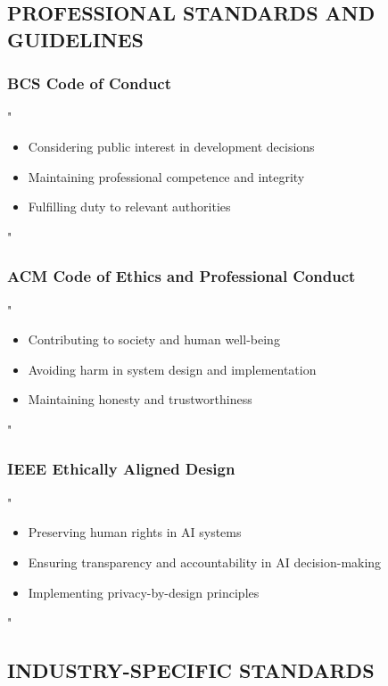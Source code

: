 \documentclass[14pt,a4paper]{article}
\begin{document}
\textit{\parencite{DfE2024b}}


\subsection*{PROFESSIONAL STANDARDS AND GUIDELINES}

\subsubsection*{BCS Code of Conduct}
"
\begin{itemize}
    \item Considering public interest in development decisions
    \item Maintaining professional competence and integrity
    \item Fulfilling duty to relevant authorities
\end{itemize}
"

\textit{\parencite[pp. 1-5]{BCS2024}}


\subsubsection*{ACM Code of Ethics and Professional Conduct}
"
\begin{itemize}
    \item Contributing to society and human well-being
    \item Avoiding harm in system design and implementation
    \item Maintaining honesty and trustworthiness
\end{itemize}
"

\textit{\parencite[pp. 1-4]{ACM2024}}

\subsubsection*{IEEE Ethically Aligned Design}
"
\begin{itemize}
    \item Preserving human rights in AI systems
    \item Ensuring transparency and accountability in AI decision-making
    \item Implementing privacy-by-design principles
\end{itemize}
"

\textit{\parencite[pp. 2-5]{IEEE2019}}


\subsection*{INDUSTRY-SPECIFIC STANDARDS}
\end{document}
